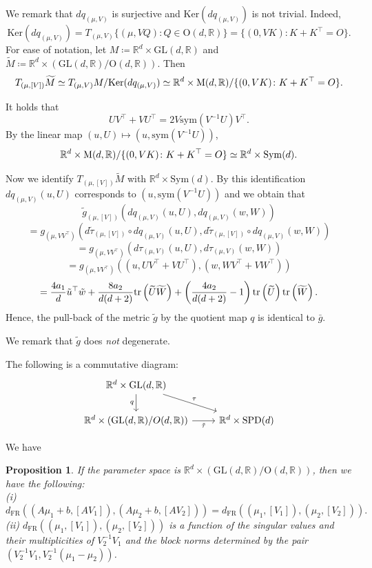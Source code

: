 \documentclass[a4paper, reqno, 11pt]{article}
\newtheorem{Prop}[Thm]{Proposition}
\theoremstyle{definition}
\def\GL{\mathrm{GL}}
\def\O{\mathrm{O}}
\def\Sym{\mathrm{Sym}}
\def\sym{\mathrm{sym}}
\def\SPD{\mathrm{SPD}}
\def\FR{{\mathrm{FR}}}
\def\Ker{{\mathrm{Ker}}}
\begin{document}
We remark that $dq_{(\mu,V)}$ is surjective and $\Ker (dq_{(\mu,V)})$ is not trivial. 
Indeed, 
\[ \Ker (dq_{(\mu,V)}) = T_{(\mu,V)}\{(\mu,VQ) \colon Q \in \O(d,\mathbb{R}) \} = \{(0,VK) \colon K + K^{\top} = O\}.\]  
For ease of notation, let $M \coloneqq  \mathbb{R}^d \times \GL(d, \mathbb R)$ and $\widetilde{M} \coloneqq  \mathbb{R}^d \times (\GL(d,\mathbb{R})/\O(d,\mathbb{R}))$. 
Then 
\[ T_{(\mu,[V])} \widetilde{M} \simeq T_{(\mu,V)} M / \Ker (dq_{(\mu,V)}) \simeq \mathbb{R}^d \times \textup{M}(d,\mathbb{R})/\{(0,VK) \colon K + K^{\top} = O\}.\]  

It holds that 
\[ UV^{\top} + V U^{\top} = 2V\sym(V^{-1}U)V^{\top}.\]
By the linear map $(u,U) \mapsto (u, \sym(V^{-1}U))$, 
\[ \mathbb{R}^d \times \textup{M}(d,\mathbb{R})/\{(0,VK) \colon K + K^{\top} = O\} \simeq \mathbb{R}^d \times \Sym(d). \]

Now we identify $T_{(\mu,[V])} \widetilde{M}$ with $\mathbb{R}^d \times \Sym(d)$. 
By this identification $dq_{(\mu,V)}(u,U)$ corresponds to $(u,\sym(V^{-1}U))$ and we obtain that 
\[ \tilde{g}_{(\mu,[V])}\left(dq_{(\mu,V)}(u,U), dq_{(\mu,V)}(w,W) \right) \]
\[ = g_{(\mu, V V^{\top})} \left(d\tilde{\tau}_{(\mu,[V])} \circ dq_{(\mu,V)}(u,U), d\tilde{\tau}_{(\mu,[V])} \circ dq_{(\mu,V)}(w,W) \right) \]
\[ = g_{(\mu, V V^{\top})} \left(d\tau_{(\mu,V)}(u,U), d\tau_{(\mu,V)}(w,W) \right) \]
\[ = g_{(\mu, V V^{\top})} \left((u,UV^{\top}+VU^{\top}), (w,WV^{\top}+VW^{\top}) \right) \]
\[ = \frac{4a_1}{d} \tilde{u}^{\top} \tilde{w} + \frac{8 a_2}{d(d+2)} \textup{tr}\left(\widetilde{U} \widetilde{W}\right) + \left(\frac{4a_2}{d(d+2)}  - 1 \right) \textup{tr}\left(\widetilde{U}\right) \textup{tr}\left(\widetilde{W}\right). \]
Hence, the pull-back of the metric $\tilde{g}$ by the quotient map $q$ is identical to $\bar{g}$.

We remark that $\tilde{g}$ does {\it not} degenerate. 

The following is a commutative diagram:
\[
\begin{tikzcd}
{\mathbb{R}^d \times \GL(d,\mathbb{R})}
\arrow[d, "{q}"']
\arrow[dr, "{\tau}"] & \\
{\mathbb{R}^d \times (\GL(d,\mathbb{R})/O(d,\mathbb{R}))}
\arrow[r, "{\tilde\tau}"'] &
{\mathbb{R}^d \times \SPD(d)}
\end{tikzcd}
\]

We have 
\begin{Prop}\label{prop:FR-quotient}
If the parameter space is $\mathbb{R}^d \times (\GL(d, \mathbb{R})/\O(d, \mathbb{R}))$, then we have the following:\\
(i) 
\[ d_{\FR}\left((A\mu_1 + b, [AV_1]), (A\mu_2 + b,  [A V_2]) \right) = d_{\FR} \left((\mu_1, [V_1]), (\mu_2, [V_2])\right). \]
(ii) 
$d_{\FR} \left((\mu_1, [V_1]), (\mu_2, [V_2])\right)$ is a function of 
the singular values and their multiplicities of $V_2^{-1}V_1$ and the block norms  determined by the pair $(V_2^{-1}V_1, V_2^{-1}(\mu_1 - \mu_2))$.
\end{Prop}
\end{document}
